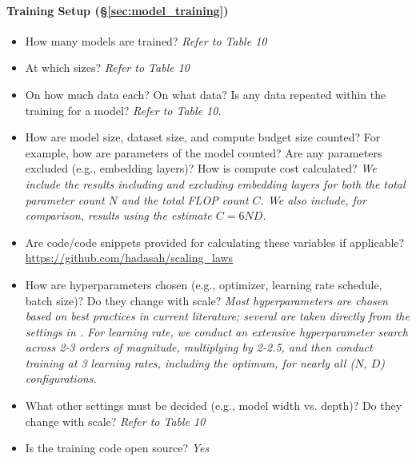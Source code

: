 {\begin{minipage}[!ht]{38em}
\begin{minipage}[!htp]{0.95\textwidth}
\paragraph{Training Setup (\S\ref{sec:model_training})}
\begin{itemize}[leftmargin=*]
    \item How many models are trained?
    \textit{Refer to Table 10}
    \item At which sizes?
    \textit{Refer to Table 10}
    \item On how much data each? On what data? Is any data repeated within the training for a model?
    \textit{Refer to Table 10.}
    \item How are model size, dataset size, and compute budget size counted? For example, how are parameters of the model counted? Are any parameters excluded (e.g., embedding layers)? How is compute cost calculated?  \textit{We include the results including and excluding embedding layers for both the total parameter count $N$ and the total FLOP count $C$. We also include, for comparison, results using the estimate $C=6ND$.}
    \item Are code/code snippets provided for calculating these variables if applicable?
    \url{https://github.com/hadasah/scaling_laws}
    \item How are hyperparameters chosen (e.g., optimizer, learning rate schedule, batch size)? Do they change with scale? \textit{Most hyperparameters are chosen based on best practices in current literature; several are taken directly from the settings in \citet{hoffmann2022training}. For learning rate, we conduct an extensive hyperparameter search across 2-3 orders of magnitude, multiplying by 2-2.5, and then conduct training at 3 learning rates, including the optimum, for nearly all ($N$, $D$) configurations.}
    \item What other settings must be decided (e.g., model width vs. depth)? Do they change with scale?  
    \textit{Refer to Table 10}
    \item Is the training code open source?
    \textit{Yes}
\end{itemize}



\raggedright

\end{minipage}

\end{minipage}}

